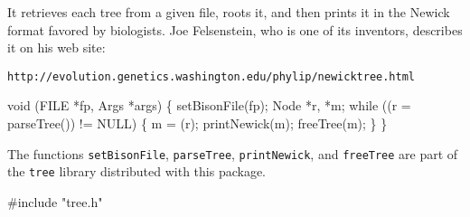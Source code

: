 \nwendcode{}\nwdocspar
It retrieves each tree from a given file, roots it, and then prints it
in the Newick format favored by biologists. Joe Felsenstein, who is
one of its inventors, describes it on his web site:
\small
\begin{verbatim}
http://evolution.genetics.washington.edu/phylip/newicktree.html
\end{verbatim}
\normalsize

\nwenddocs{}\endmoddef\nwstartdeflinemarkup{}\nwenddeflinemarkup
void (FILE *fp, Args *args) \{
  setBisonFile(fp);
  Node *r, *m;
  while ((r = parseTree()) != NULL) \{
    m = (r);
    printNewick(m);
    freeTree(m);
  \}
\}

\nwendcode{}\nwdocspar
The functions \texttt{setBisonFile}, \texttt{parseTree},
\texttt{printNewick}, and \texttt{freeTree} are part of the
\texttt{tree} library distributed with this package.

\nwenddocs{}\plusendmoddef\nwstartdeflinemarkup{}\nwenddeflinemarkup
#include "tree.h"

